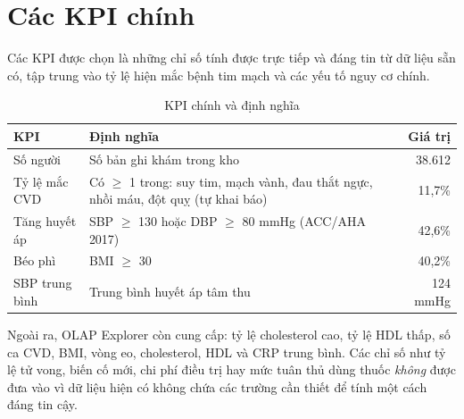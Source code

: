 \section{Các KPI chính}
Các KPI được chọn là những chỉ số tính được trực tiếp và đáng tin từ dữ liệu sẵn có, tập trung vào tỷ lệ hiện mắc bệnh tim mạch và các yếu tố nguy cơ chính.
\begin{table}[H]
\renewcommand{\arraystretch}{1.35}\setlength{\extrarowheight}{3pt}
\centering
\caption{KPI chính và định nghĩa}
\small
\begin{tabularx}{\textwidth}{|p{3.5cm}|X|r|}
\hline
\textbf{KPI} & \textbf{Định nghĩa} & \textbf{Giá trị} \\ \hline
Số người & Số bản ghi khám trong kho & 38.612 \\ \hline
Tỷ lệ mắc CVD & Có $\geq$ 1 trong: suy tim, mạch vành, đau thắt ngực, nhồi máu, đột quỵ (tự khai báo) & 11,7\% \\ \hline
Tăng huyết áp & SBP $\geq$ 130 hoặc DBP $\geq$ 80 mmHg (ACC/AHA 2017) & 42,6\% \\ \hline
Béo phì & BMI $\geq$ 30 & 40,2\% \\ \hline
SBP trung bình & Trung bình huyết áp tâm thu & 124 mmHg \\ \hline
\end{tabularx}
\end{table}
Ngoài ra, OLAP Explorer còn cung cấp: tỷ lệ cholesterol cao, tỷ lệ HDL thấp, số ca CVD, BMI, vòng eo, cholesterol, HDL và CRP trung bình. Các chỉ số như tỷ lệ tử vong, biến cố mới, chi phí điều trị hay mức tuân thủ dùng thuốc \emph{không} được đưa vào vì dữ liệu hiện có không chứa các trường cần thiết để tính một cách đáng tin cậy.

